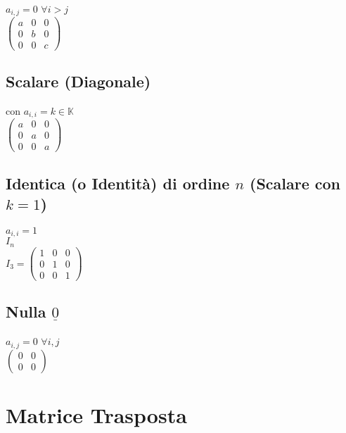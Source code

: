 \documentclass[a4paper, twoside, italian, 11pt]{book}
\newcommand{\K}{\mathbb{K}}
\begin{document}
$a_{i,j} = 0$ $\forall i > j$ \\

\noindent
$\begin{pmatrix}
a & 0 & 0 \\
0 & b & 0 \\
0 & 0 & c
\end{pmatrix}$


\subsection{Scalare (Diagonale)}

con $a_{i,i} = k \in \K$ \\

\noindent
$\begin{pmatrix}
a & 0 & 0 \\
0 & a & 0 \\
0 & 0 & a
\end{pmatrix}$


\subsection{Identica (o Identità) di ordine $n$ (Scalare con $k = 1$)}

$a_{i,i} = 1$ \\

\noindent
$I_n$ \\

\noindent
$I_3 = \begin{pmatrix}
1 & 0 & 0 \\
0 & 1 & 0 \\
0 & 0 & 1
\end{pmatrix}$


\subsection{Nulla $\underline{0}$}

$a_{i,j} = 0$ $\forall i, j$ \\

\noindent
$\begin{pmatrix}
0 & 0 \\
0 & 0
\end{pmatrix}$



\section{Matrice Trasposta}
\end{document}
